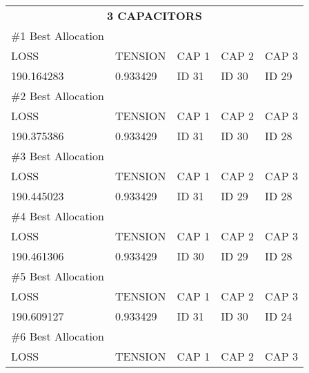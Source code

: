 \documentclass[12pt]{article}
\begin{document}
	\begin{table}[]
		\centering
		\begin{tabular}{lllll}
			\multicolumn{5}{c}{\textbf{3 CAPACITORS}}     \vspace{0.3cm}   \\
			\#1 Best Allocation                    &          &       &       &       \\ \hline
			LOSS                                   & TENSION  & CAP 1 & CAP 2 & CAP 3 \\
			190.164283                             & 0.933429 & ID 31 & ID 30 & ID 29 \vspace{0.3cm} \\
			\#2 Best Allocation                    &          &       &       &       \\ \hline
			LOSS                                   & TENSION  & CAP 1 & CAP 2 & CAP 3 \\
			190.375386                             & 0.933429 & ID 31 & ID 30 & ID 28 \vspace{0.3cm} \\
			\#3 Best Allocation                    &          &       &       &       \\ \hline
			LOSS                                   & TENSION  & CAP 1 & CAP 2 & CAP 3 \\
			190.445023                             & 0.933429 & ID 31 & ID 29 & ID 28 \vspace{0.3cm} \\
			\#4 Best Allocation                    &          &       &       &       \\ \hline
			LOSS                                   & TENSION  & CAP 1 & CAP 2 & CAP 3 \\
			190.461306                             & 0.933429 & ID 30 & ID 29 & ID 28 \vspace{0.3cm} \\
			\#5 Best Allocation                    &          &       &       &       \\ \hline
			LOSS                                   & TENSION  & CAP 1 & CAP 2 & CAP 3 \\
			190.609127                             & 0.933429 & ID 31 & ID 30 & ID 24 \vspace{0.3cm} \\
			\#6 Best Allocation                    &          &       &       &       \\ \hline
			LOSS                                   & TENSION  & CAP 1 & CAP 2 & CAP 3 \\

\end{tabular}
\end{table}
\end{document}
